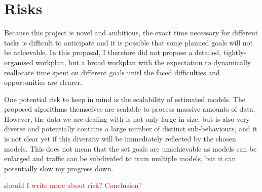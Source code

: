 \documentclass[a4paper,12pt,twoside]{report}
\begin{document}

\section{Risks}

Because this project is novel and ambitious, the exact time necessary for different tasks is difficult to anticipate and it is possible that some planned goals will not be achievable. In this proposal, I therefore did not propose a detailed, tightly-organised workplan, but a broad workplan with the expectation to dynamically reallocate time spent on different goals unitl the faced difficulties and opportunities are clearer.

One potential risk to keep in mind is the scalability of estimated models. The proposed algorithms themselves are scalable to process massive amounts of data. However, the data we are dealing with is not only large in size, but is also very diverse and potentially contains a large number of distinct sub-behaviours, and it is not clear yet if this diversity will be immediately reflected by the chosen models. This does not mean that the set goals are unachievable as models can be enlarged and traffic can be subdivided to train multiple models, but it can potentially slow my progress down.

\textcolor{red}{should I write more about risk? Conclusion?}





\end{document}
